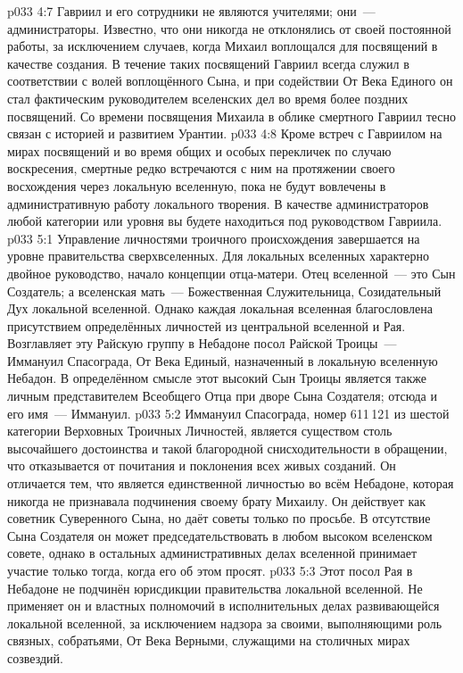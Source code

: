 \vs p033 4:7 \pc Гавриил и его сотрудники не являются учителями; они~--- администраторы. Известно, что они никогда не отклонялись от своей постоянной работы, за исключением случаев, когда Михаил воплощался для посвящений в качестве создания. В течение таких посвящений Гавриил всегда служил в соответствии с волей воплощённого Сына, и при содействии От Века Единого он стал фактическим руководителем вселенских дел во время более поздних посвящений. Со времени посвящения Михаила в облике смертного Гавриил тесно связан с историей и развитием Урантии.
\vs p033 4:8 Кроме встреч с Гавриилом на мирах посвящений и во время общих и особых перекличек по случаю воскресения, смертные редко встречаются с ним на протяжении своего восхождения через локальную вселенную, пока не будут вовлечены в административную работу локального творения. В качестве администраторов любой категории или уровня вы будете находиться под руководством Гавриила.
\vs p033 5:1 Управление личностями троичного происхождения завершается на уровне правительства сверхвселенных. Для локальных вселенных характерно двойное руководство, начало концепции отца\hyp{}матери. Отец вселенной~--- это Сын Создатель; а вселенская мать~--- Божественная Служительница, Созидательный Дух локальной вселенной. Однако каждая локальная вселенная благословлена присутствием определённых личностей из центральной вселенной и Рая. Возглавляет эту Райскую группу в Небадоне посол Райской Троицы~--- Иммануил Спасограда, От Века Единый, назначенный в локальную вселенную Небадон. В определённом смысле этот высокий Сын Троицы является также личным представителем Всеобщего Отца при дворе Сына Создателя; отсюда и его имя~--- Иммануил.
\vs p033 5:2 Иммануил Спасограда, номер 611\,121 из шестой категории Верховных Троичных Личностей, является существом столь высочайшего достоинства и такой благородной снисходительности в обращении, что отказывается от почитания и поклонения всех живых созданий. Он отличается тем, что является единственной личностью во всём Небадоне, которая никогда не признавала подчинения своему брату Михаилу. Он действует как советник Суверенного Сына, но даёт советы только по просьбе. В отсутствие Сына Создателя он может председательствовать в любом высоком вселенском совете, однако в остальных административных делах вселенной принимает участие только тогда, когда его об этом просят.
\vs p033 5:3 Этот посол Рая в Небадоне не подчинён юрисдикции правительства локальной вселенной. Не применяет он и властных полномочий в исполнительных делах развивающейся локальной вселенной, за исключением надзора за своими, выполняющими роль связных, собратьями, От Века Верными, служащими на столичных мирах созвездий.
